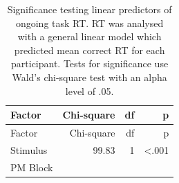 \documentclass[11pt,]{article}
\begin{document}
\begin{longtable}[]{@{}lrrr@{}}
\caption{Significance testing linear predictors of ongoing task RT. RT
was analysed with a general linear model which predicted mean correct RT
for each participant. Tests for significance use Wald's chi-square test
with an alpha level of .05.}\tabularnewline
\toprule
\begin{minipage}[b]{0.36\columnwidth}\raggedright\strut
Factor\strut
\end{minipage} & \begin{minipage}[b]{0.16\columnwidth}\raggedleft\strut
Chi-square\strut
\end{minipage} & \begin{minipage}[b]{0.06\columnwidth}\raggedleft\strut
df\strut
\end{minipage} & \begin{minipage}[b]{0.06\columnwidth}\raggedleft\strut
p\strut
\end{minipage}\tabularnewline
\midrule
\endfirsthead
\toprule
\begin{minipage}[b]{0.36\columnwidth}\raggedright\strut
Factor\strut
\end{minipage} & \begin{minipage}[b]{0.16\columnwidth}\raggedleft\strut
Chi-square\strut
\end{minipage} & \begin{minipage}[b]{0.06\columnwidth}\raggedleft\strut
df\strut
\end{minipage} & \begin{minipage}[b]{0.06\columnwidth}\raggedleft\strut
p\strut
\end{minipage}\tabularnewline
\midrule
\endhead
\begin{minipage}[t]{0.36\columnwidth}\raggedright\strut
Stimulus\strut
\end{minipage} & \begin{minipage}[t]{0.16\columnwidth}\raggedleft\strut
99.83\strut
\end{minipage} & \begin{minipage}[t]{0.06\columnwidth}\raggedleft\strut
1\strut
\end{minipage} & \begin{minipage}[t]{0.06\columnwidth}\raggedleft\strut
\textless{}.001\strut
\end{minipage}\tabularnewline
\begin{minipage}[t]{0.36\columnwidth}\raggedright\strut
PM Block\strut
\end{minipage} & \begin{minipage}[t]{0.16\columnwidth}\raggedleft\strut

\end{minipage}
\end{longtable}
\end{document}

